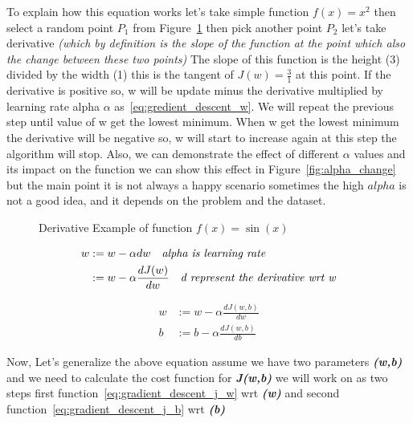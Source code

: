 To explain how this equation works let's take simple function $f(x) = x^2$ then select a random point $P_1$ from Figure~\ref{fig:derivative_example} then pick another point $P_2$ let's take derivative \textit{(which by definition is the slope of the function at the point which also the change between these two points)} The slope of this function is the height (3) divided by the width (1) this is the tangent of $J(w)=\frac{3}{1}$ at this point. If the derivative is positive so, w will be update minus the derivative multiplied by learning rate alpha $\alpha$ as~\eqref{eq:gredient_descent_w}. We will repeat the previous step until value of w get the lowest minimum. When w get the lowest minimum the derivative will be negative so, w will start to increase again at this step the algorithm will stop. Also, we can demonstrate the effect of different $\alpha$ values and its impact on the function we can show this effect in Figure~\ref{fig:alpha_change} but the main point it is not always a happy scenario sometimes the high $alpha$ is not a good idea, and it depends on the problem and the dataset.


\begin{figure}[!h]
\begin{center}

\caption{Derivative Example of function $f(x) = \sin(x)$ }\label{fig:derivative_example}
\end{center}
\end{figure} 


\begin{equation}\label{eq:gredient_descent_w}
  \begin{split}
    w & := w - \alpha dw \quad \text{\textit{alpha is learning rate}}\\
      & := w - \alpha \frac{dJ(w)}{dw} \quad \text{\textit{d represent the derivative wrt w}}
  \end{split}
\end{equation}

\begin{subequations}
     \begin{align}
w& := w - \alpha \frac{dJ(w,b)}{dw} \label{eq:gradient_descent_j_w}\\
b& := b - \alpha \frac{dJ(w,b)}{db} \label{eq:gradient_descent_j_b}
     \end{align}
   \end{subequations}

\newpage
Now, Let's generalize the above equation assume we have two parameters  \textbf{\textit{(w,b)}} and we need to calculate the cost function for  \textbf{\textit{J(w,b)}} we will work on as two steps first function~\eqref{eq:gradient_descent_j_w}  wrt \textbf{\textit{(w)}} and second function~\eqref{eq:gradient_descent_j_b} wrt \textbf{\textit{(b)}}

